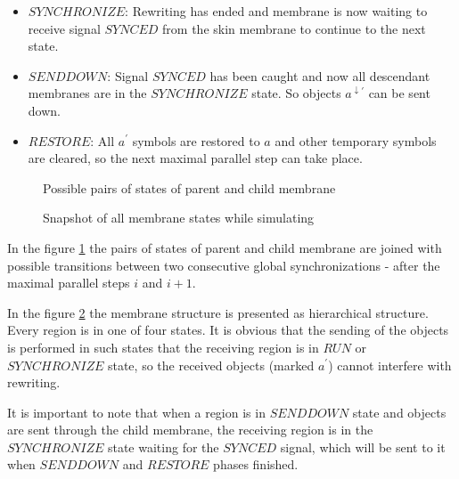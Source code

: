 \begin{dokaz}
\begin{itemize}
    \item $SYNCHRONIZE$: Rewriting has ended and membrane is now waiting to receive signal $SYNCED$ from the skin membrane to continue to the next state.

    \item $SENDDOWN$: Signal $SYNCED$ has been caught and now all descendant membranes are in the $SYNCHRONIZE$ state. So objects $a^{\downarrow\prime}$ can be sent down.

    \item $RESTORE$: All $a^{\prime}$ symbols are restored to $a$ and other temporary symbols are cleared, so the next maximal parallel step can take place.
  \end{itemize}

  \begin{figure}
    \def\svgwidth{\textwidth}
    
    \caption{Possible pairs of states of parent and child membrane}
    \label{fig:possible_pairs_of_states_of_parent_and_child_membrane}
  \end{figure}

  \begin{figure}
    \def\svgwidth{\textwidth}
    
    \caption{Snapshot of all membrane states while simulating}
    \label{fig:snapshot_of_all_membrane_states_while_simulating}
  \end{figure}

  In the figure \ref{fig:possible_pairs_of_states_of_parent_and_child_membrane} the pairs of states of parent and child membrane are joined with possible transitions between two consecutive global synchronizations - after the maximal parallel steps $i$ and $i+1$.

  In the figure \ref{fig:snapshot_of_all_membrane_states_while_simulating} the membrane structure is presented as hierarchical structure. Every region is in one of four states. It is obvious that the sending of the objects is performed in such states that the receiving region is in $RUN$ or $SYNCHRONIZE$ state, so the received objects (marked $a^{\prime}$) cannot interfere with rewriting.

  It is important to note that when a region is in $SENDDOWN$ state and objects are sent through the child membrane, the receiving region is in the $SYNCHRONIZE$ state waiting for the $SYNCED$ signal, which will be sent to it when $SENDDOWN$ and $RESTORE$ phases finished.
  


\end{dokaz}
